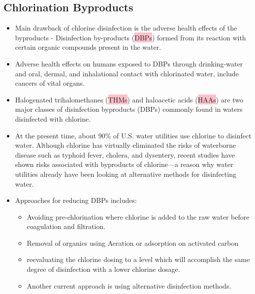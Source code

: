 \subsection{Chlorination Byproducts}
\begin{itemize}
\item Main drawback of chlorine disinfection is the adverse health effects of the byproducts - Disinfection by-products (\colorbox{pink}{DBPs}) formed from its reaction with certain organic compounds present in the water.
\item  Adverse health effects on humans exposed to DBPs through drinking-water and oral, dermal, and inhalational contact with chlorinated water, include cancers of vital organs.
\item Halogenated trihalomethanes (\colorbox{pink}{THMs}) and haloacetic acids (\colorbox{pink}{HAAs}) are two major classes of disinfection byproducts (DBPs) commonly found in waters disinfected with chlorine. 
\item At the present time, about 90\% of U.S. water utilities use chlorine to disinfect water. Although chlorine has virtually eliminated the risks of waterborne disease such as typhoid fever, cholera, and dysentery, recent studies have shown risks associated with byproducts of chlorine—a reason why water utilities already have been looking at alternative methods for disinfecting water.
\item Approaches for reducing DBPs includes:
\begin{itemize}
\item Avoiding pre-chlorination where chlorine is added to the raw water before coagulation and filtration.
\item Removal of organics using Aeration or adsorption on activated carbon 
\item reevaluating the chlorine dosing to a level which will accomplish the same degree of disinfection with a lower chlorine dosage.
\item Another current approach is using alternative disinfection methods.
\end{itemize}
\end{itemize}

